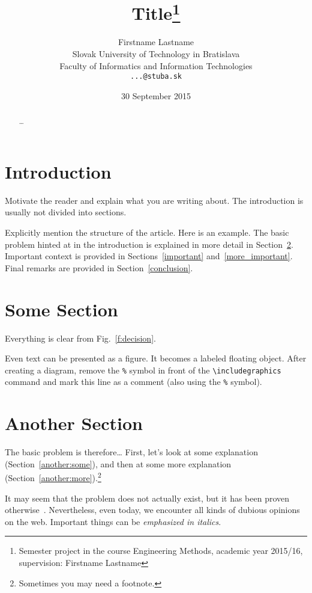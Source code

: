 \documentclass[10pt,twoside,english,a4paper]{article}
\title{Title\thanks{Semester project in the course Engineering Methods, academic year 2015/16, supervision: Firstname Lastname}} %
\author{Firstname Lastname\\[2pt]
	{\small Slovak University of Technology in Bratislava}\\
	{\small Faculty of Informatics and Information Technologies}\\
	{\small \texttt{...@stuba.sk}}
	}
\date{\small 30 September 2015} %
\begin{document}
\maketitle

\begin{abstract}
\ldots
\end{abstract}



\section{Introduction}

Motivate the reader and explain what you are writing about. The introduction is usually not divided into sections.

Explicitly mention the structure of the article. Here is an example.
The basic problem hinted at in the introduction is explained in more detail in Section~\ref{some}.
Important context is provided in Sections~\ref{important} and~\ref{more_important}.
Final remarks are provided in Section~\ref{conclusion}.



\section{Some Section} \label{some}

Everything is clear from Fig.~\ref{f:decision}.

\begin{figure*}[tbh]
\centering
Even text can be presented as a figure. It becomes a labeled floating object. After creating a diagram, remove the \texttt{\%} symbol in front of the \verb|\includegraphics| command and mark this line as a comment (also using the \texttt{\%} symbol).
\caption{The decisive argument.}
\label{f:decision}
\end{figure*}



\section{Another Section} \label{another}

The basic problem is therefore\ldots{} First, let's look at some explanation (Section~\ref{another:some}), and then at some more explanation (Section~\ref{another:more}).\footnote{Sometimes you may need a footnote.}

It may seem that the problem does not actually exist\cite{Coplien:MPD}, but it has been proven otherwise~\cite{Czarnecki:Staged, Czarnecki:Progress}. Nevertheless, even today, we encounter all kinds of dubious opinions on the web\cite{PLP-Framework}. Important things can be \emph{emphasized in italics}.
\end{document}
